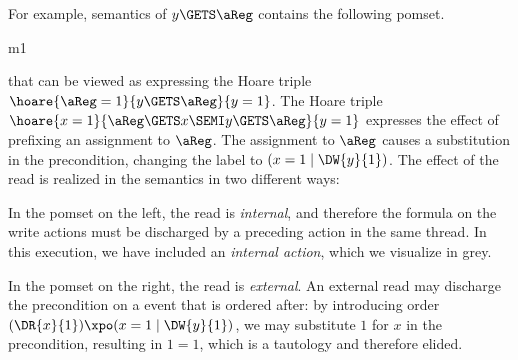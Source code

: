 
For example, semantics of $y\GETS \aReg$ contains the following pomset.  
\begin{tikzdisplaylabel}[node distance=1em]{m1}
\end{tikzdisplaylabel}
that can be viewed as expressing the Hoare triple $\hoare{\aReg =1}{y\GETS \aReg}{y=1}$. 
The Hoare triple $\hoare{x =1}{\aReg\GETS x\SEMI y\GETS \aReg}{y =1}$ expresses the effect of prefixing an assignment to $\aReg$.
The assignment to $\aReg$ causes a substitution in
the precondition, changing the label to $(x=1\mid \DW{y}{1})$.
The effect of the read is realized in the semantics in two different ways:
\begin{displaymathsmall}
\qquad{}\qquad\qquad
{}
\end{displaymathsmall}

In the pomset on the left, the read is \emph{internal}, and therefore the
formula on the write actions must be discharged by a preceding action in the  same thread.   In this execution, we have included an \emph{internal action}, which we visualize in grey.  

In the pomset on the right, the read is \emph{external}.  An
external read may discharge the precondition on a event that is ordered
after: by introducing order $(\DR{x}{1})\xpo(x=1\mid\DW{y}{1})$, we may
substitute $1$ for $x$ in the precondition, resulting in $1=1$, which is a
tautology and therefore elided.

